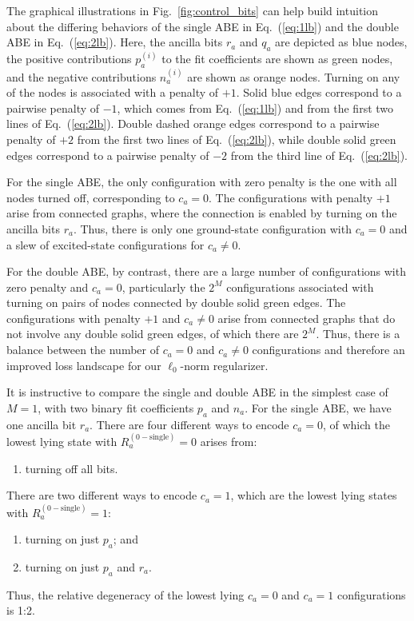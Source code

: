 \documentclass[aps,prd,twocolumn, superscriptaddress,preprintnumbers, nofootinbib,longbibliography,floatfix]{revtex4-2}
\DeclareRobustCommand{\Fig}[1]{Fig.~\ref{#1}}
\DeclareRobustCommand{\Eq}[1]{Eq.~(\ref{#1})}
\begin{document}
The graphical illustrations in \Fig{fig:control_bits} can help build intuition about the differing behaviors of the single ABE in \Eq{eq:1lb} and the double ABE in \Eq{eq:2lb}.
%
Here, the ancilla bits $r_a$ and $q_a$ are depicted as blue nodes, the positive contributions $p_a^{(i)}$ to the fit coefficients are shown as green nodes, and the negative contributions $n_a^{(i)}$ are shown as orange nodes.
%
Turning on any of the nodes is associated with a penalty of $+1$.
%
Solid blue edges correspond to a pairwise penalty of $-1$, which comes from \Eq{eq:1lb} and from the first two lines of \Eq{eq:2lb}.
%
Double dashed orange edges correspond to a pairwise penalty of $+2$ from the first two lines of \Eq{eq:2lb}, while double solid green edges correspond to a pairwise penalty of $-2$ from the third line of \Eq{eq:2lb}.



For the single ABE, the only configuration with zero penalty is the one with all nodes turned off, corresponding to $c_a=0$.
%
The configurations with penalty $+1$ arise from connected graphs, where the connection is enabled by turning on the ancilla bits $r_a$.
%
Thus, there is only one ground-state configuration with $c_a=0$ and a slew of excited-state configurations for $c_a \not= 0$.


For the double ABE, by contrast, there are a large number of configurations with zero penalty and $c_a=0$, particularly the $2^M$ configurations associated with turning on pairs of nodes connected by double solid green edges.
%
The configurations with penalty $+1$ and $c_a \not= 0$ arise from connected graphs that do not involve any double solid green edges, of which there are $2^M$.
%
Thus, there is a balance between the number of $c_a=0$ and $c_a \not= 0$ configurations and therefore an improved loss landscape for our $\ell_0$-norm regularizer.


It is instructive to compare the single and double ABE in the simplest case of $M = 1$, with two binary fit coefficients $p_a$ and $n_a$.
%
For the single ABE, we have one ancilla bit $r_a$.
%
There are four different ways to encode $c_a=0$, of which the lowest lying state with $R_a^{(0-\text{single})}=0$ arises from:
%
\begin{enumerate}[label=(\roman*)]
\item turning off all bits.
\end{enumerate}
%
There are two different ways to encode $c_a=1$, which are the lowest lying states with $R_a^{(0-\text{single})}=1$:
%
\begin{enumerate}[label=(\roman*)]
\item turning on just $p_a$; and
\item turning on just $p_a$ and $r_a$.
\end{enumerate}
%
Thus, the relative degeneracy of the lowest lying $c_a=0$ and $c_a=1$ configurations is 1:2.
\end{document}
